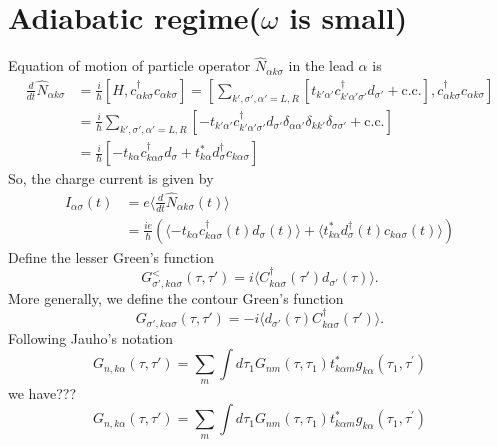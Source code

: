 \documentclass[11pt,a4paper]{article}
\begin{document}
\section{Adiabatic regime($\omega$ is small)}
Equation of motion of particle operator $\hat{N}_{\alpha k\sigma}$ in the lead $\alpha$ is
\begin{equation}
\begin{split}
\frac{d}{dt}\hat{N}_{\alpha k\sigma} &= \frac{i}{\hbar}[H, c_{\alpha k\sigma}^{\dag}c_{\alpha k\sigma}] = \left[\sum_{k', \sigma', \alpha'=L, R}\left[t_{k' \alpha'} c_{k' \alpha' \sigma'}^{\dag} d_{\sigma'}+\mathrm{c.c.}\right], c_{\alpha k\sigma}^{\dag}c_{\alpha k\sigma}\right]\\
&=\frac{i}{\hbar}\sum_{k', \sigma', \alpha'=L, R}\left[ -t_{k' \alpha'} c_{k' \alpha' \sigma'}^{\dag} d_{\sigma'}\delta_{\alpha\alpha'}\delta_{kk'}\delta_{\sigma\sigma'}+\mathrm{c.c.}\right]\\
&=\frac{i}{\hbar}[-t_{k \alpha} c_{k \alpha \sigma}^{\dag} d_{\sigma} + t_{k \alpha}^{*} d_{\sigma}^{\dag}c_{k \alpha \sigma}]
\end{split}
\end{equation}
So, the charge current is given by
\begin{equation}
\begin{split}
I_{\alpha\sigma}(t) &= e\langle\frac{d}{dt}\hat{N}_{\alpha k\sigma}(t)\rangle \\
&=\frac{ie}{\hbar}(\langle -t_{k \alpha} c_{k \alpha \sigma}^{\dag}(t) d_{\sigma}(t)\rangle + \langle t_{k \alpha}^{*} d_{\sigma}^{\dag}(t)c_{k \alpha \sigma}(t)\rangle)
\end{split}
\end{equation}
Define the lesser Green's function
\begin{equation}
G_{\sigma',k\alpha\sigma}^{<}(\tau,\tau') = i\langle C_{k\alpha\sigma}^{\dag}(\tau') d_{\sigma'}(\tau)\rangle .
\end{equation}
More generally, we define the contour Green's function
\begin{equation}
G_{\sigma',k\alpha\sigma}(\tau,\tau') = -i\langle  d_{\sigma'}(\tau) C_{k\alpha\sigma}^{\dag}(\tau')\rangle .
\end{equation}
Following Jauho's notation~\cite{Jauho}
\begin{equation}
G_{n,k\alpha}(\tau,\tau')=\sum_{m} \int d \tau_{1} G_{n m}\left(\tau, \tau_{1}\right) t_{k \alpha m}^{*} g_{k \alpha}\left(\tau_{1}, \tau^{\prime}\right)
\end{equation}
we have???
\begin{equation}
G_{n,k\alpha}(\tau,\tau')=\sum_{m} \int d \tau_{1} G_{n m}\left(\tau, \tau_{1}\right) t_{k \alpha m}^{*} g_{k \alpha}\left(\tau_{1}, \tau^{\prime}\right)
\end{equation}
\end{document}
